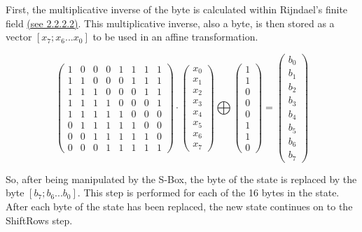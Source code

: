 \documentclass[12pt, a4paper]{report}
\theoremstyle{definition}
\theoremstyle{remark}
\begin{document}
First, the multiplicative inverse of the byte is calculated within Rijndael's finite field \hyperref[Inverse]{(see 2.2.2.2)}. This multiplicative inverse, also a byte, is then stored as a vector $[x_7; x_6 ... x_0]$ to be used in an affine transformation.

\[ \left( \begin{array}{cccccccc}
1 & 0 & 0 & 0 & 1 & 1 & 1 & 1 \\
1 & 1 & 0 & 0 & 0 & 1 & 1 & 1 \\
1 & 1 & 1 & 0 & 0 & 0 & 1 & 1 \\
1 & 1 & 1 & 1 & 0 & 0 & 0 & 1 \\
1 & 1 & 1 & 1 & 1 & 0 & 0 & 0 \\
0 & 1 & 1 & 1 & 1 & 1 & 0 & 0 \\
0 & 0 & 1 & 1 & 1 & 1 & 1 & 0 \\
0 & 0 & 0 & 1 & 1 & 1 & 1 & 1\end{array} \right)
\cdot
\left( \begin{array}{c}
x_0 \\
x_1 \\
x_2 \\
x_3 \\
x_4 \\
x_5 \\
x_6 \\
x_7\end{array} \right)
\bigoplus
\left( \begin{array}{c}
1 \\
1 \\
0 \\
0 \\
0 \\
1 \\
1 \\
0\end{array} \right)
=
\left( \begin{array}{c}
b_0 \\
b_1 \\
b_2 \\
b_3 \\
b_4 \\
b_5 \\
b_6 \\
b_7\end{array} \right)
\]

So, after being manipulated by the S-Box, the byte of the state is replaced by the byte $[b_7; b_6 ... b_0 ]$. This step is performed for each of the 16 bytes in the state. After each byte of the state has been replaced, the new state continues on to the ShiftRows step.
\end{document}
